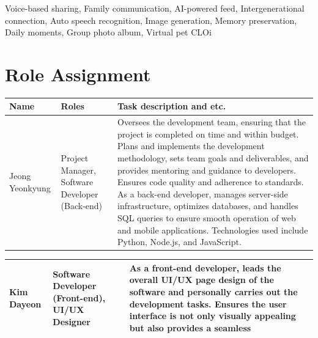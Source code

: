 \documentclass[conference]{IEEEtran}
\begin{document}
\begin{IEEEkeywords}
Voice-based sharing, Family communication, AI-powered feed, Intergenerational connection, Auto speech recognition, Image generation, Memory preservation, Daily moments, Group photo album, Virtual pet CLOi
\end{IEEEkeywords}

\section{Role Assignment}
\begin{table}[htbp]
\begin{tabular}{|p{1cm}|p{1.7cm}|p{5cm}|}
    \hline
    Name & Roles & Task description and etc. \\
    \hline
    Jeong Yeonkyung &  Project Manager, Software Developer (Back-end) & Oversees the development team, ensuring that the project is completed on time and within budget. Plans and implements the development methodology, sets team goals and deliverables, and provides mentoring and guidance to developers. Ensures code quality and adherence to standards. As a back-end developer, manages server-side infrastructure, optimizes databases, and handles SQL queries to ensure smooth operation of web and mobile applications. Technologies used include Python, Node.js, and JavaScript.\\
    \hline
        \end{tabular}
\end{table}
\begin{table}[htbp]
    \begin{tabular}{|p{1cm}|p{1.7cm}|p{5cm}|}
    \hline
    Kim Dayeon & Software Developer (Front-end), UI/UX Designer & As a front-end developer, leads the overall UI/UX page design of the software and personally carries out the development tasks. Ensures the user interface is not only visually appealing but also provides a seamless \\
    \hline
    \end{tabular}
\end{table}
\end{document}
